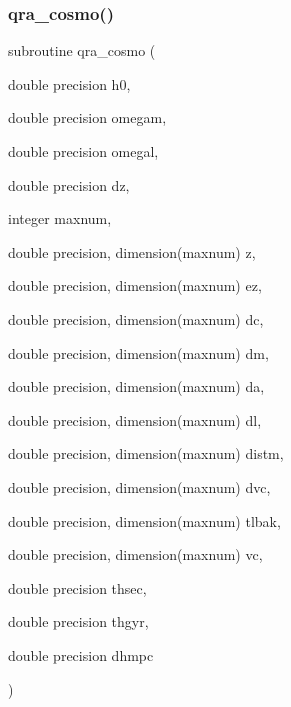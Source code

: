 \mbox{\label{qra__cosmo_8f_a16198438d6f7834db63956669ef90b98}} 
\subsubsection{\texorpdfstring{qra\+\_\+cosmo()}{qra\_cosmo()}}
{\footnotesize\ttfamily subroutine qra\+\_\+cosmo (\begin{DoxyParamCaption}\item[{double precision}]{h0,  }\item[{double precision}]{omegam,  }\item[{double precision}]{omegal,  }\item[{double precision}]{dz,  }\item[{integer}]{maxnum,  }\item[{double precision, dimension(maxnum)}]{z,  }\item[{double precision, dimension(maxnum)}]{ez,  }\item[{double precision, dimension(maxnum)}]{dc,  }\item[{double precision, dimension(maxnum)}]{dm,  }\item[{double precision, dimension(maxnum)}]{da,  }\item[{double precision, dimension(maxnum)}]{dl,  }\item[{double precision, dimension(maxnum)}]{distm,  }\item[{double precision, dimension(maxnum)}]{dvc,  }\item[{double precision, dimension(maxnum)}]{tlbak,  }\item[{double precision, dimension(maxnum)}]{vc,  }\item[{double precision}]{thsec,  }\item[{double precision}]{thgyr,  }\item[{double precision}]{dhmpc }\end{DoxyParamCaption})}

